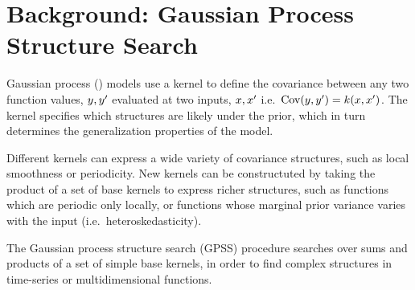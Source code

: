 \documentclass[twoside]{article}
\def\ie{i.e.\ }
\begin{document}


\section{Background: Gaussian Process Structure Search}
\label{sec:gpss}

Gaussian process (\gp{}) models \cite{rasmussen38gaussian} use a kernel to define the covariance between any two function values, $y, y'$ evaluated at two inputs, $x,x'$ \ie ${\textrm{Cov}(y, y') = k(x,x')}$.
The kernel specifies which structures are likely under the \gp{} prior, which in turn determines the generalization properties of the model.

Different kernels can express a wide variety of covariance structures, such as local smoothness or periodicity.
New kernels can be constructuted by taking the product of a set of base kernels to express richer structures, such as functions which are periodic only locally, or functions whose marginal prior variance varies with the input (\ie heteroskedasticity).

The Gaussian process structure search (GPSS) procedure \citep{DuvLloGroetal13} searches over sums and products of a set of simple base kernels, in order to find complex structures in time-series or multidimensional functions.


\end{document}
